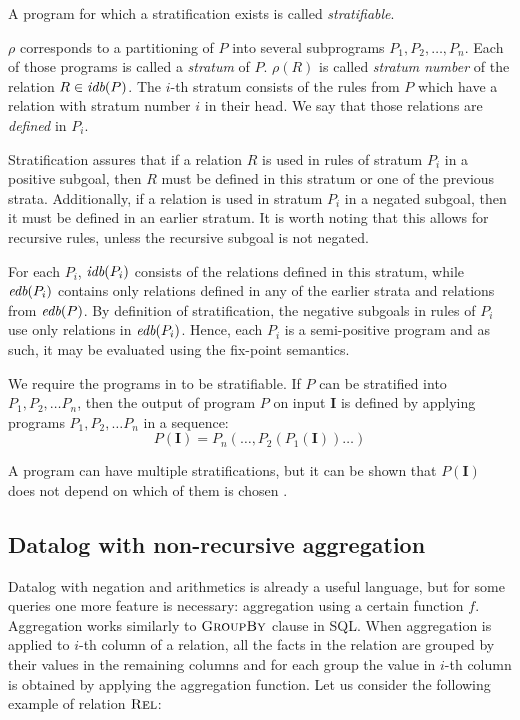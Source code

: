 A program for which a stratification exists is called \emph{stratifiable}. 

$\rho$ corresponds to a partitioning of $P$ into several subprograms $P_1, P_2, \dots, P_n$. Each of those programs is called a \emph{stratum} of $P$. $\rho(R)$ is called \emph{stratum number} of the relation $R \in \textit{idb}(P )$. The $i$-th stratum consists of the rules from $P$ which have a relation with stratum number $i$ in their head. We say that those relations are \emph{defined} in $P_i$.

Stratification assures that if a relation $R$ is used in rules of stratum $P_i$ in a positive subgoal, then $R$ must be defined in this stratum or one of the previous strata. Additionally, if a relation is used in stratum $P_i$ in a negated subgoal, then it must be defined in an earlier stratum. It is worth noting that this allows for recursive rules, unless the recursive subgoal is not negated.

For each $P_i$, $\textit{idb}(P_i)$ consists of the relations defined in this stratum, while $\textit{edb}(P_i)$ contains only relations defined in any of the earlier strata and relations from $\textit{edb}(P)$. By definition of stratification, the negative subgoals in rules of $P_i$ use only relations in $\textit{edb}(P_i)$. Hence, each $P_i$ is a semi-positive program and as such, it may be evaluated using the fix-point semantics.

We require the programs in \datalogneg to be stratifiable. If $P$ can be stratified into $P_1, P_2, \dots P_n$, then the output of program $P$ on input $\textbf{I}$ is defined by applying programs $P_1, P_2, \dots P_n$ in a sequence:
$$P(\textbf{I}) = P_n(\dots, P_2(P_1(\textbf{I}))\dots)$$

A program can have multiple stratifications, but it can be shown that $P(\textbf{I})$ does not depend on which of them is chosen \cite{fod}.


\subsection{Datalog with non-recursive aggregation}\label{ss:datalognra}

Datalog with negation and arithmetics is already a useful language, but for some queries one more feature is necessary: aggregation using a certain function $f$. Aggregation works similarly to $\textsc{GroupBy}$ clause in SQL. When aggregation is applied to $i$-th column of a relation, all the facts in the relation are grouped by their values in the remaining columns and for each group the value in $i$-th column is obtained by applying the aggregation function.
Let us consider the following example of relation $\textsc{Rel}$:

